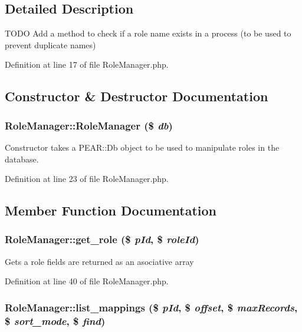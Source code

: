 \subsection{Detailed Description}
TODO Add a method to check if a role name exists in a process (to be used to prevent duplicate names) 



Definition at line 17 of file Role\-Manager.php.

\subsection{Constructor \& Destructor Documentation}
\subsubsection{\setlength{\rightskip}{0pt plus 5cm}Role\-Manager::Role\-Manager (\$ {\em db})}\label{classRoleManager_a0}


Constructor takes a PEAR::Db object to be used to manipulate roles in the database. 

Definition at line 23 of file Role\-Manager.php.

\subsection{Member Function Documentation}
\subsubsection{\setlength{\rightskip}{0pt plus 5cm}Role\-Manager::get\_\-role (\$ {\em p\-Id}, \$ {\em role\-Id})}\label{classRoleManager_a2}


Gets a role fields are returned as an asociative array 

Definition at line 40 of file Role\-Manager.php.
\subsubsection{\setlength{\rightskip}{0pt plus 5cm}Role\-Manager::list\_\-mappings (\$ {\em p\-Id}, \$ {\em offset}, \$ {\em max\-Records}, \$ {\em sort\_\-mode}, \$ {\em find})}\label{classRoleManager_a6}


